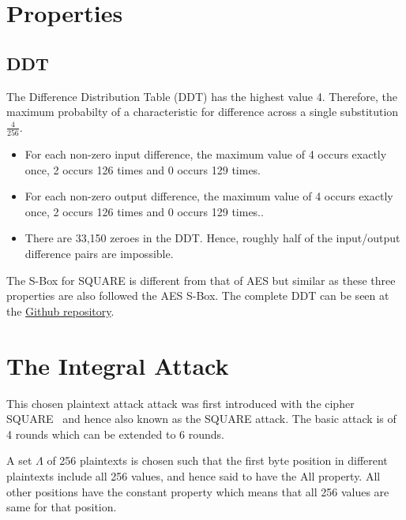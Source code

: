 \documentclass[preprint]{transcrypto}
\begin{document}
\section{Properties}
\subsection{DDT}
The Difference Distribution Table (DDT) has the highest value 4. Therefore, the maximum probabilty of a characteristic for difference across a single substitution $\frac{4}{256}$.

\begin{itemize}
  \item For each non-zero input difference, the maximum value of 4 occurs exactly once, 2 occurs 126 times and 0 occurs 129 times.
  \item For each non-zero output difference, the maximum value of 4 occurs exactly once, 2 occurs 126 times and 0 occurs 129 times..
  \item There are 33,150 zeroes in the DDT. Hence, roughly half of the input/output difference pairs are impossible.
\end{itemize}

The S-Box for SQUARE is different from that of AES but similar as these three properties are also followed the AES S-Box. The complete DDT can be seen at the \href{https://github.com/supercoww/square-term-paper/blob/master/code/scripts/ddt.txt}{Github repository}.

\section{The Integral Attack}
This chosen plaintext attack attack was first introduced with the cipher SQUARE~\cite{FSE:DaeKnuRij97} and hence also known as the SQUARE attack. The basic attack is of 4 rounds which can be extended to 6 rounds.

A set $\Lambda$ of 256 plaintexts is chosen such that the first byte position in different plaintexts include all 256 values, and hence said to have the All property. All other positions have the constant property which means that all 256 values are same for that position.
\end{document}
